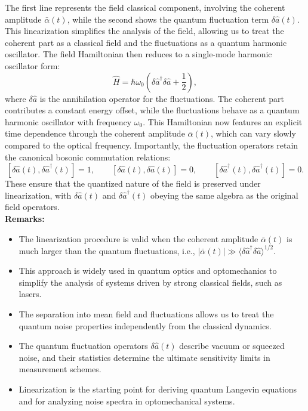 The first line represents the field classical component, involving the coherent amplitude $\bar{\alpha}(t)$, while the second shows the quantum fluctuation term $\delta\hat{a}(t)$. This linearization simplifies the analysis of the field, allowing us to treat the coherent part as a classical field and the fluctuations as a quantum harmonic oscillator. The field Hamiltonian then reduces to a single-mode harmonic oscillator form:
\begin{equation}
\hat{H} = \hbar \omega_0 \left( \delta \hat{a}^\dagger \delta \hat{a} + \frac{1}{2} \right),
\end{equation}
where $\delta \hat{a}$ is the annihilation operator for the fluctuations. The coherent part contributes a constant energy offset, while the fluctuations behave as a quantum harmonic oscillator with frequency $\omega_0$. This Hamiltonian now features an explicit time dependence through the coherent amplitude $\bar{\alpha}(t)$, which can vary slowly compared to the optical frequency.
Importantly, the fluctuation operators retain the canonical bosonic commutation relations:
\[
[\delta \hat{a}(t), \delta \hat{a}^\dagger(t)] = 1, \qquad
[\delta \hat{a}(t), \delta \hat{a}(t)] = 0, \qquad
[\delta \hat{a}^\dagger(t), \delta \hat{a}^\dagger(t)] = 0.
\]
These ensure that the quantized nature of the field is preserved under linearization, with $\delta \hat{a}(t)$ and $\delta \hat{a}^\dagger(t)$ obeying the same algebra as the original field operators. \\

\textbf{Remarks:} 
\begin{itemize}
  \item The linearization procedure is valid when the coherent amplitude $\bar{\alpha}(t)$ is much larger than the quantum fluctuations, i.e., $|\bar{\alpha}(t)| \gg \langle \delta\hat{a}^\dagger \delta\hat{a} \rangle^{1/2}$.
  \item This approach is widely used in quantum optics and optomechanics to simplify the analysis of systems driven by strong classical fields, such as lasers.
  \item The separation into mean field and fluctuations allows us to treat the quantum noise properties independently from the classical dynamics.
  \item The quantum fluctuation operators $\delta\hat{a}(t)$ describe vacuum or squeezed noise, and their statistics determine the ultimate sensitivity limits in measurement schemes.
  \item Linearization is the starting point for deriving quantum Langevin equations and for analyzing noise spectra in optomechanical systems.
\end{itemize}
